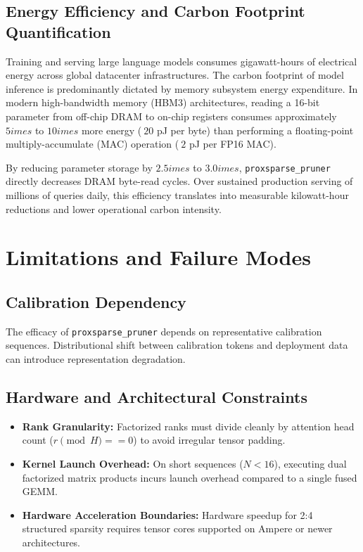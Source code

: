 \subsection{Energy Efficiency and Carbon Footprint Quantification}
Training and serving large language models consumes gigawatt-hours of electrical energy across global datacenter infrastructures. The carbon footprint of model inference is predominantly dictated by memory subsystem energy expenditure. In modern high-bandwidth memory (HBM3) architectures, reading a 16-bit parameter from off-chip DRAM to on-chip registers consumes approximately $5	imes$ to $10	imes$ more energy ($~20$ pJ per byte) than performing a floating-point multiply-accumulate (MAC) operation ($~2$ pJ per FP16 MAC).

By reducing parameter storage by $2.5	imes$ to $3.0	imes$, \texttt{proxsparse\_pruner} directly decreases DRAM byte-read cycles. Over sustained production serving of millions of queries daily, this efficiency translates into measurable kilowatt-hour reductions and lower operational carbon intensity.


\section{Limitations and Failure Modes}

\subsection{Calibration Dependency}
The efficacy of \texttt{proxsparse\_pruner} depends on representative calibration sequences. Distributional shift between calibration tokens and deployment data can introduce representation degradation.

\subsection{Hardware and Architectural Constraints}
\begin{itemize}
\item \textbf{Rank Granularity:} Factorized ranks must divide cleanly by attention head count ($r \pmod H == 0$) to avoid irregular tensor padding.
\item \textbf{Kernel Launch Overhead:} On short sequences ($N < 16$), executing dual factorized matrix products incurs launch overhead compared to a single fused GEMM.
\item \textbf{Hardware Acceleration Boundaries:} Hardware speedup for 2:4 structured sparsity requires tensor cores supported on Ampere or newer architectures.
\end{itemize}

